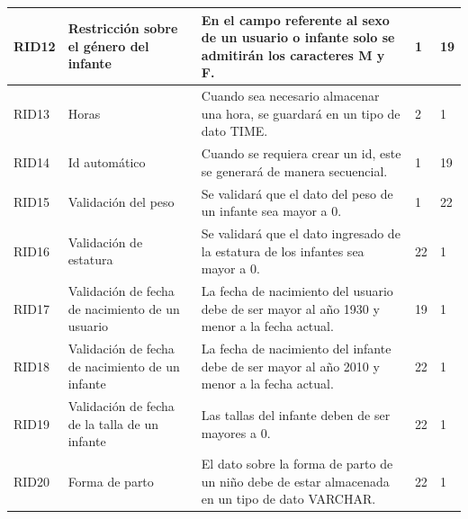 \documentclass{article}
\begin{document}
\begin{longtable}{|p{1.0cm}|p{3.0cm}|p{5.0cm}|p{1.2cm}|p{0.75cm}|}
	\hline
	RID12 & Restricción sobre el género del infante & En el campo referente al sexo de un usuario o infante solo se admitirán los caracteres M y F. & 1 & 19 \\
	\hline
	RID13 & Horas & Cuando sea necesario almacenar una hora, se guardará en un tipo de dato TIME. & 2 & 1 \\
	\hline
	RID14 & Id automático & Cuando se requiera crear un id, este se generará de manera secuencial. & 1 & 19 \\
	\hline
	RID15 & Validación del peso & Se validará que el dato del peso de un infante sea mayor a 0. & 1 & 22 \\
	\hline	

	RID16 &
	Validación de estatura&
	Se validará que el dato ingresado de la estatura de los infantes sea mayor a 0.&
	22&
	1 \\ \hline
	
	RID17 &
	Validación de fecha de nacimiento de un usuario&
	La fecha de nacimiento del usuario debe de ser mayor al año 1930 y menor a la fecha actual.&
	19&
	1 \\ \hline

	RID18 &
	Validación de fecha de nacimiento de un infante&
	La fecha de nacimiento del infante debe de ser mayor al año 2010 y menor a la fecha actual.&
	22&
	1 \\ \hline

	RID19 &
	Validación de fecha de la talla de un infante&
	Las tallas del infante deben de ser mayores a 0.&
	22&
	1 \\ \hline
	
	RID20 &
	Forma de parto&
	El dato sobre la forma de parto de un niño debe de estar almacenada en un tipo de dato VARCHAR.&
	22&
	1 \\ \hline

	\end{longtable}
\end{document}
